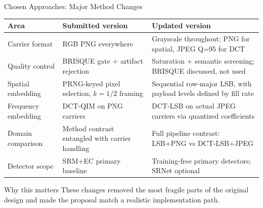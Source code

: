 \documentclass[aspectratio=169,11pt]{beamer}
\begin{document}
\begin{frame}{Chosen Approaches: Major Method Changes}
\tiny
\renewcommand{\arraystretch}{1.18}
\begin{tabular}{@{}p{3.4cm}p{4.9cm}p{4.9cm}@{}}
\toprule
\textbf{Area} & \textbf{Submitted version} & \textbf{Updated version} \\
\midrule
Carrier format & RGB PNG everywhere & Grayscale throughout; PNG for spatial, JPEG Q=95 for DCT \\
Quality control & BRISQUE gate + artifact rejection & Saturation + semantic screening; BRISQUE discussed, not used \\
Spatial embedding & PRNG-keyed pixel selection, $k=1/2$ framing & Sequential row-major LSB, with payload levels defined by fill rate \\
Frequency embedding & DCT-QIM on PNG carriers & DCT-LSB on actual JPEG carriers via quantized coefficients \\
Domain comparison & Method contrast entangled with carrier handling & Full pipeline contrast: LSB+PNG vs DCT-LSB+JPEG \\
Detector scope & SRM+EC primary baseline & Training-free primary detectors; SRNet optional \\
\bottomrule
\end{tabular}

\vspace{0.08cm}
\begin{block}{Why this matters}
These changes removed the most fragile parts of the original design and made the proposal match a realistic implementation path.
\end{block}
\end{frame}
\end{document}
